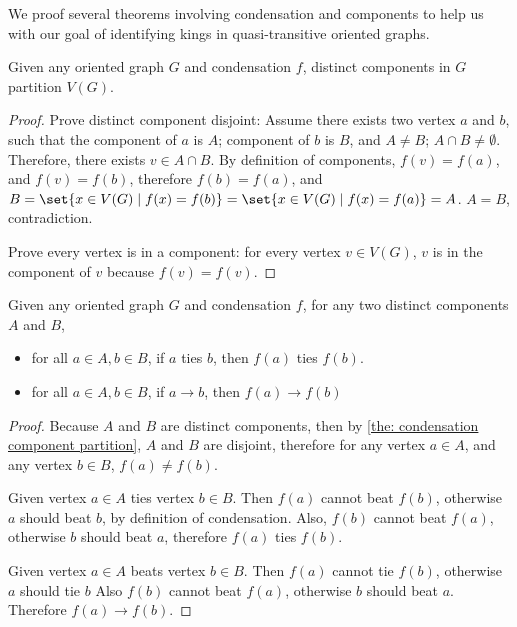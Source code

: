We proof several theorems involving condensation and components
to help us with our goal of identifying kings in
quasi-transitive oriented graphs.

\begin{theorem}\label{the: condensation component partition}
  Given any oriented graph \(G\) and condensation \(f\),
  distinct components in \(G\) partition \(V(G)\).
\end{theorem}

\begin{proof}
  Prove distinct component disjoint:
  Assume there exists two vertex \(a\) and \(b\),
  such that the component of \(a\) is \(A\);
  component of \(b\) is \(B\),
  and \(A \neq B\); \(A \cap B \neq \emptyset \).
  Therefore, there exists \(v \in A \cap B\).
  By definition of components,
  \(f(v) = f(a)\), and \(f(v) = f(b)\),
  therefore \(f(b) = f(a)\),
  and \(B
  = \set{x \in V(G) \mid f(x) = f(b)}
  = \set{x \in V(G) \mid f(x) = f(a)}
  = A\).
   \(A = B\), contradiction.

  Prove every vertex is in a component:
  for every vertex \(v \in V(G)\),
  \(v\) is in the component of \(v\) because \(f(v) = f(v)\).
\end{proof}

\begin{lemma}\label{the: vertex force image beating}
  Given any oriented graph \(G\) and condensation \(f\),
  for any two distinct components \(A\) and \(B\),
  \begin{itemize}
    \item
      for all \(a \in A, b \in B\), if \(a\) ties \(b\),
      then \(f(a)\) ties \(f(b)\).
    \item
      for all \(a \in A, b \in B\), if \(a \to b\),
      then \(f(a) \to f(b)\)
  \end{itemize}
\end{lemma}

\begin{proof}
  Because \(A\) and \(B\) are distinct components,
  then by \cref{the: condensation component partition},
  \(A\) and \(B\) are disjoint,
  therefore for any vertex \(a \in A\),
  and any vertex \(b \in B\), \(f(a) \neq f(b)\).

  Given vertex \(a \in A\) ties vertex \(b \in B\).
  Then \(f(a)\) cannot beat \(f(b)\),
  otherwise \(a\) should beat \(b\), by definition of condensation.
  Also, \(f(b)\) cannot beat \(f(a)\),
  otherwise \(b\) should beat \(a\),
  therefore \(f(a)\) ties \(f(b)\).

  Given vertex \(a \in A\) beats vertex \(b \in B\).
  Then \(f(a)\) cannot tie \(f(b)\),
  otherwise \(a\) should tie \(b\)
  Also \(f(b)\) cannot beat \(f(a)\),
  otherwise \(b\) should beat \(a\).
  Therefore \(f(a) \to f(b)\).
\end{proof}

